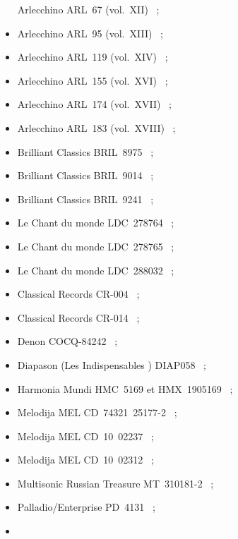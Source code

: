 \begin{itemize}
 Arlecchino ARL~67 (vol.~XII) \citep{Luguenot95a}~;
 \item
 Arlecchino ARL~95 (vol.~XIII) \citep{Luguenot95b, Schonberg95a}~;
 \item
 Arlecchino ARL~119 (vol.~XIV) \citep{Schonberg95a}~;
 \item
 Arlecchino ARL~155 (vol.~XVI) \citep{Bosch, Schonberg96}~;
 \item
 Arlecchino ARL~174 (vol.~XVII) \citep{Hawkins96}~;
 \item
 Arlecchino ARL~183 (vol.~XVIII) \citep{Hawkins96}~;
 \item
 Brilliant Classics BRIL~8975 \citep{Clarke, Cochard08b, Cowan08,
 Harrington09b, Haylock09, Naulleau11, Woolf09a}~;
 \item
 Brilliant Classics BRIL~9014 \citep{Baron09, Muhlbock}~;
 \item
 Brilliant Classics BRIL~9241 \citep{Harrington12}~;
 \item
 Le Chant du monde LDC~278764 \citep{Baron13, Boissard13, Rabinowitz89,
 Stewart}~;
 \item
 Le Chant du monde LDC~278765 \citep{Rabinowitz89, Sanders88, Simmons,
 Stewart, Sykora88}~;
 \item
 Le Chant du monde LDC~288032 \citep{Freslon92, Hawkins92, McLachlan92,
 Rabinowitz92, Rabinowitz98, Stewart}~;
 \item
 Classical Records CR-004 \citep{Woolf06}~;
 \item
 Classical Records CR-014 \citep{Leonard}~;
 \item
 Denon COCQ-84242 \citep{Marcinik}~;
 \item
 Diapason (Les Indispensables ) DIAP058 \citep{Boissard14a}~;
 \item
 Harmonia Mundi HMC~5169 et HMX~1905169 \citep{Drillon, Fanning87, Glass,
 LaGrange86, Moor87, Roux86, Wiser}~;
 \item
 Melodija MEL CD~74321~25177-2 \citep{Bernager, Fanning95, Layton,
 Pappastavrou96, Schonberg95b}~;
 \item
 Melodija MEL CD~10~02237 \citep{Arloff, Boissard14b, Cowan15,
 Harrington15a}~;
 \item
 Melodija MEL CD~10~02312 \citep{Baronian, Becker16, Boissard16, Cowan16,
 Duerer, Hoffele16, Theurich, Westbrook}~;
 \item
 Multisonic Russian Treasure MT~310181-2 \citep{Fanning94, Hoffele,
 Schonberg01}~;
 \item
 Palladio/Enterprise PD~4131 \citep{Evans94}~;
 \item

\end{itemize}
